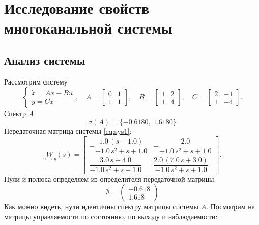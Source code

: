 \section{Исследование свойств многоканальной системы}
\subsection{Анализ системы}
Рассмотрим систему
\begin{equation}
    \label{eq:sys1}
    \begin{cases}
        \dot x=Ax+Bu\\
        y=Cx
    \end{cases},\quad
    A=\begin{bmatrix}
        0 & 1 \\
        1 & 1
        \end{bmatrix},\quad
        B=\begin{bmatrix}
        1 & 2 \\
        1 & 4
        \end{bmatrix},\quad
        C=\begin{bmatrix}
        2 & -1 \\
        1 & -4
    \end{bmatrix}.
\end{equation}
Спектр $A$
\begin{equation*}
    \sigma(A)=\{-0.6180,\ 1.6180\}
\end{equation*}
Передаточная матрица системы \eqref{eq:sys1}:
\begin{equation*}
    \underset{u\rightarrow y}{W}(s)=\begin{bmatrix}
        -\dfrac{1.0\,{\left(s-1.0\right)}}{-1.0\,s^2 +s+1.0} & -\dfrac{2.0}{-1.0\,s^2 +s+1.0}\\[2ex]
        \dfrac{3.0\,s+4.0}{-1.0\,s^2 +s+1.0} & \dfrac{2.0\,{\left(7.0\,s+3.0\right)}}{-1.0\,s^2 +s+1.0}
    \end{bmatrix}.
\end{equation*}
Нули и полюса определяем из определителя передаточной матрицы:
\begin{equation*}
    \emptyset,\quad \left(\begin{array}{c}
-0.618\\
1.618
\end{array}\right)
\end{equation*}
Как можно видеть, нули идентичны спектру матрицы системы $A$.
Посмотрим на матрицы управляемости по состоянию, по выходу и наблюдаемости:
